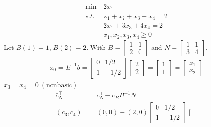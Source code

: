 \documentclass[11pt]{article}
\numberwithin{equation}{section}
\begin{document}
\begin{example}
    \begin{align*}
        \min \ &2x_1 \\
        s.t.\ & x_{1}+x_{2}+x_{3}+x_{4}=2 \\
        & 2 x_{1}+3x_{3}+4x_{4}=2 \\
        & x_{1},x_{2},x_{3},x_{4} \geq 0
    \end{align*}
    Let $B(1)=1$, $B(2)=2$. With $
        B=\left[\begin{array}{ll}
            1 & 1 \\
            2 & 0
            \end{array}\right]$ and $
            N=\left[\begin{array}{ll}
                1 & 1 \\
                3 & 4
                \end{array}\right]$, \begin{align*}
                    x_{0}=B^{-1} b=\left[\begin{array}{ll}
                        0 & 1 / 2 \\
                        1 & -1 / 2
                        \end{array}\right]\left[\begin{array}{l}
                        2 \\
                        2
                        \end{array}\right]=\left[\begin{array}{l}
                        1 \\
                        1
                        \end{array}\right]=\left[\begin{array}{l}
                        x_{1} \\
                        x_{2}
                        \end{array}\right]
                \end{align*}
    $x_3 = x_4 = 0 \  (\text{nonbasic})$
    \begin{align*}
        \bar{c}_{N}^\top &= c_{N}^{\top}-c_{B}^{\top} B^{-1} N \\
        \left(\bar{c}_{3}, \bar{c}_{4}\right) &=(0,0)-(2,0)\left[\begin{array}{cc}
            0 & 1 / 2 \\
            1 & -1 / 2
            \end{array}\right]\left[\begin{array}{ll}

\end{array}
\end{align*}
\end{example}
\end{document}
